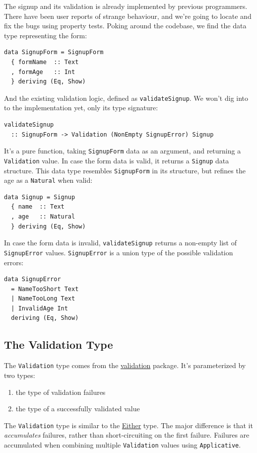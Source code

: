 \vspace{0.8\baselineskip}


\noindent The signup and its validation is already implemented by previous
programmers. There have been user reports of strange behaviour, and
we're going to locate and fix the bugs using property tests.
Poking around the codebase, we find the data type representing the form:

\begin{verbatim}
data SignupForm = SignupForm
  { formName  :: Text
  , formAge   :: Int
  } deriving (Eq, Show)
\end{verbatim}
And the existing validation logic, defined as \texttt{validateSignup}.
We won't dig into to the implementation yet, only its type signature:

\begin{verbatim}
validateSignup
  :: SignupForm -> Validation (NonEmpty SignupError) Signup
\end{verbatim}
It's a pure function, taking \texttt{SignupForm} data as an argument,
and returning a \texttt{Validation} value. In case the form data is
valid, it returns a \texttt{Signup} data structure. This data type
resembles \texttt{SignupForm} in its structure, but refines the age as a
\texttt{Natural} when valid:

\begin{verbatim}
data Signup = Signup
  { name  :: Text
  , age   :: Natural
  } deriving (Eq, Show)
\end{verbatim}
In case the form data is invalid, \texttt{validateSignup} returns a
non-empty list of \texttt{SignupError} values. \texttt{SignupError} is a
union type of the possible validation errors:

\begin{verbatim}
data SignupError
  = NameTooShort Text
  | NameTooLong Text
  | InvalidAge Int
  deriving (Eq, Show)
\end{verbatim}



\subsection{The Validation Type}
\label{the-validation-type}

The \texttt{Validation} type comes from the
\href{https://hackage.haskell.org/package/validation}{validation}
package. It's parameterized by two types:

\begin{enumerate}
\def\labelenumi{\arabic{enumi}.}

\item
  the type of validation failures
\item
  the type of a successfully validated value
\end{enumerate}
The \texttt{Validation} type is similar to the
\href{https://hackage.haskell.org/package/base-4.12.0.0/docs/Data-Either.html\#t:Either}{Either}
type. The major difference is that it \emph{accumulates} failures,
rather than short-circuiting on the first failure. Failures are
accumulated when combining multiple \texttt{Validation} values using
\texttt{Applicative}.

